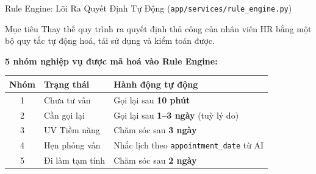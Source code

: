 \begin{frame}{Rule Engine: Lõi Ra Quyết Định Tự Động (\texttt{app/services/rule\_engine.py})}
    \begin{block}{Mục tiêu}
        Thay thế quy trình ra quyết định thủ công của nhân viên HR bằng một bộ quy tắc tự động hoá, tái sử dụng và kiểm toán được.
    \end{block}
    \vspace{0.2cm}
    \textbf{5 nhóm nghiệp vụ được mã hoá vào Rule Engine:}
    \begin{table}[]
        \centering
        \renewcommand{\arraystretch}{1.3}
        \begin{tabular}{|c|l|p{4.5cm}|}
            \hline
            \textbf{Nhóm} & \textbf{Trạng thái} & \textbf{Hành động tự động} \\ \hline
            1 & Chưa tư vấn & Gọi lại sau \textbf{10 phút} \\ \hline
            2 & Cần gọi lại & Gọi lại sau \textbf{1--3 ngày} (tuỳ lý do) \\ \hline
            3 & UV Tiềm năng & Chăm sóc sau \textbf{3 ngày} \\ \hline
            4 & Hẹn phỏng vấn & Nhắc lịch theo \texttt{appointment\_date} từ AI \\ \hline
            5 & Đi làm tạm tính & Chăm sóc sau \textbf{2 ngày} \\ \hline
        \end{tabular}
    \end{table}
\end{frame}



